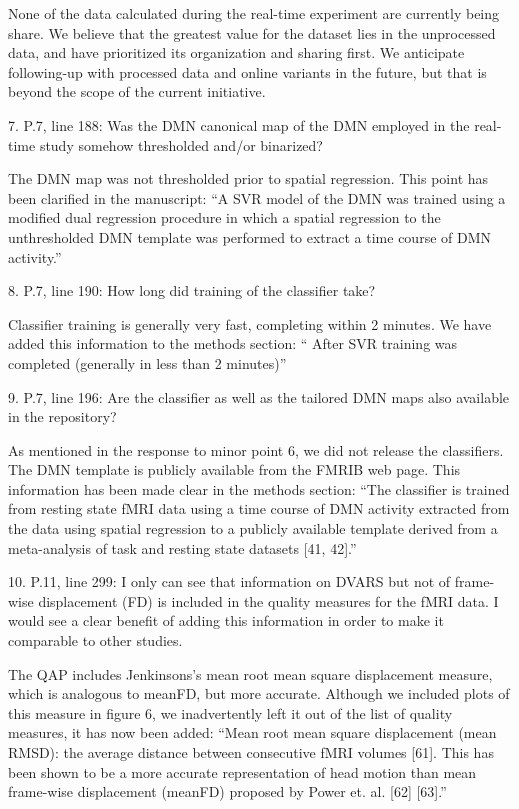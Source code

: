 \documentclass{article}
\newcommand{\RESPONSE}[1]{\textcolor{responseblue}{#1}}
\begin{document}
\RESPONSE{None of the data calculated during the real-time experiment are currently being share. We believe that the greatest value for the dataset lies in the unprocessed data, and have prioritized its organization and sharing first. We anticipate following-up with processed data and online variants in the future, but that is beyond the scope of the current initiative.}

7. P.7, line 188: Was the DMN canonical map of the DMN employed in the real-time study somehow thresholded and/or binarized?

\RESPONSE{The DMN map was not thresholded prior to spatial regression. This point has been clarified in the manuscript: ``A SVR model of the DMN was trained using a modified dual regression procedure in which a spatial regression to the unthresholded DMN template was performed to extract a time course of DMN activity.''}

8. P.7, line 190: How long did training of the classifier take?

\RESPONSE{Classifier training is generally very fast, completing within 2 minutes. We have added this information to the methods section: `` After SVR training was completed (generally in less than 2 minutes)''}

9. P.7, line 196: Are the classifier as well as the tailored DMN maps also available in the repository?

\RESPONSE{As mentioned in the response to minor point 6, we did not release the classifiers. The DMN template is publicly available from the FMRIB web page. This information has been made clear in the methods section: ``The classifier is trained from resting state fMRI data using a time course of DMN activity extracted from the data using spatial regression to a publicly available template derived from a meta-analysis of task and resting state datasets [41, 42].''}

10. P.11, line 299: I only can see that information on DVARS but not of frame-wise displacement (FD) is included in the quality measures for the fMRI data. I would see a clear benefit of adding this information in order to make it comparable to other studies.

\RESPONSE{The QAP includes Jenkinsons's mean root mean square displacement measure, which is analogous to meanFD, but more accurate. Although we included plots of this measure in figure 6, we inadvertently left it out of the list of quality measures, it has now been added: ``Mean  root  mean  square  displacement  (mean  RMSD): the average distance between consecutive fMRI volumes  [61].   This  has been shown  to  be  a  more  accurate  representation  of  head  motion  than mean frame-wise displacement (meanFD) proposed by Power et.  al.  [62] [63].''}
\end{document}
